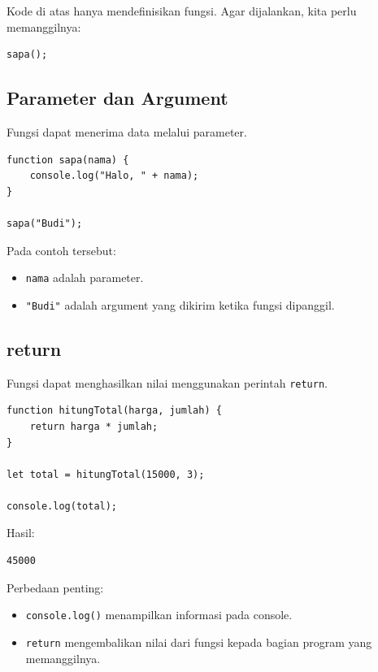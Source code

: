 \documentclass[12pt,a4paper]{article}
\begin{document}
Kode di atas hanya mendefinisikan fungsi.
Agar dijalankan, kita perlu memanggilnya:

\begin{lstlisting}
sapa();
\end{lstlisting}

\subsection{Parameter dan Argument}

Fungsi dapat menerima data melalui parameter.

\begin{lstlisting}
function sapa(nama) {
    console.log("Halo, " + nama);
}

sapa("Budi");
\end{lstlisting}

Pada contoh tersebut:

\begin{itemize}
    \item \texttt{nama} adalah parameter.
    \item \texttt{"Budi"} adalah argument yang dikirim
    ketika fungsi dipanggil.
\end{itemize}

\subsection{return}

Fungsi dapat menghasilkan nilai menggunakan
perintah \texttt{return}.

\begin{lstlisting}
function hitungTotal(harga, jumlah) {
    return harga * jumlah;
}

let total = hitungTotal(15000, 3);

console.log(total);
\end{lstlisting}

Hasil:

\begin{lstlisting}
45000
\end{lstlisting}

Perbedaan penting:

\begin{itemize}
    \item \texttt{console.log()} menampilkan informasi
    pada console.
    \item \texttt{return} mengembalikan nilai dari fungsi
    kepada bagian program yang memanggilnya.
\end{itemize}
\end{document}

